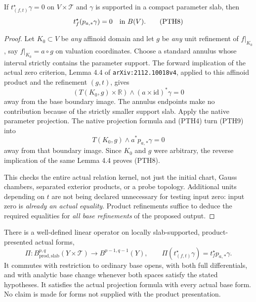 \begin{lemma}
If $t_{(f,t)}^\star\gamma=0$ on $V\times\mathcal T$ and $\gamma$
is supported in a compact parameter slab, then
\[
                       t_f^\star(p_{a,*}\gamma)=0
                                   \quad\hbox{in }B(V).
 \tag{PTH8}
\]
\end{lemma}

\begin{proof}
Let $K_0\subset V$ be \emph{any} affinoid domain and let
$g$ be \emph{any} unit refinement of $f|_{K_0}$, say
$f|_{K_0}=a\circ g$ on valuation coordinates.  Choose a standard
annulus whose interval strictly contains the parameter support.
The forward implication of the actual zero criterion, Lemma 4.4
of \texttt{arXiv:2112.10018v4}, applied to this affinoid product
and the refinement $(g,t)$, gives
\[
 (T(K_0,g)\times\mathbb R)
                \wedge(a\times\mathrm{id})^*\gamma=0
 \tag{PTH9}
\]
away from the base boundary image.  The annulus endpoints make
no contribution because of the strictly smaller support slab.
Apply the native parameter projection.  The native projection
formula and (PTH4) turn (PTH9) into
\[
                T(K_0,g)\wedge a^*p_{a,*}\gamma=0
 \tag{PTH10}
\]
away from that boundary image.  Since $K_0$ and $g$ were arbitrary,
the reverse implication of the same Lemma 4.4 proves (PTH8).

This checks the entire actual relation kernel, not just the
initial chart, Gauss chambers, separated exterior products, or a
probe topology.  Additional units depending on $t$ are not being
declared unnecessary for testing input zero: input zero is
\emph{already an actual equality}.  Product refinements suffice
to deduce the required equalities for \emph{all base refinements}
of the proposed output.
\end{proof}

\begin{theorem}
There is a well-defined linear operator on locally slab-supported,
product-presented actual forms,
\[
 \Pi:B^{p,q}_{\mathrm{prod,slab}}(Y\times\mathcal T)
                                  \longrightarrow B^{p-1,q-1}(Y),
 \qquad
 \Pi(t_{(f,t)}^\star\gamma)=t_f^\star p_{a,*}\gamma.
 \tag{PTH11}
\]
It commutes with restriction to ordinary base opens, with both
full differentials, and with analytic base change whenever both
spaces satisfy the stated hypotheses.  It satisfies the actual
projection formula with every actual base form.  No claim is
made for forms not supplied with the product presentation.
\end{theorem}

